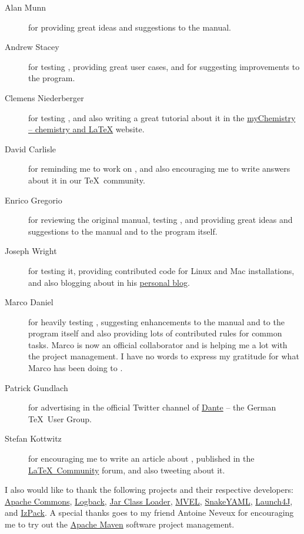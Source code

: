 \documentclass[a4paper,twoside,12pt]{memoir}
\begin{document}
\begin{description}
\item[Alan Munn] for providing great ideas and suggestions to the manual.
\item[Andrew Stacey] for testing \arara, providing great user cases, and for suggesting improvements to the program.
\item[Clemens Niederberger] for testing \arara, and also writing a great tutorial about it in the \href{http://www.mychemistry.eu/2012/06/arara-automate-latex-birds-music/}{myChemistry  -- chemistry and \LaTeX} website.
\item[David Carlisle] for reminding me to work on \arara, and also encouraging me to write answers about it in our \TeX\ community.
\item[Enrico Gregorio] for reviewing the original manual, testing \arara, and providing great ideas and suggestions to the manual and to the program itself.
\item[Joseph Wright] for testing it, providing contributed code for Linux and Mac installations, and also blogging about \arara in his \href{http://www.texdev.net}{personal blog}.
\item[Marco Daniel] for heavily testing \arara, suggesting enhancements to the manual and to the program itself and also providing lots of contributed rules for common tasks. Marco is now an official collaborator and is helping me a lot with the project management. I have no words to express my gratitude for what Marco has been doing to \arara.
\item[Patrick Gundlach] for advertising \arara in the official Twitter channel of \href{http://www.dante.de}{Dante} -- the German \TeX\ User Group.
\item[Stefan Kottwitz] for encouraging me to write an article about \arara, published in the \href{http://latex-community.org/know-how/435-gnuplot-arara}{\LaTeX\ Community} forum, and also tweeting about it.
\end{description}

I also would like to thank the following projects and their respective developers: \href{http://commons.apache.org}{Apache Commons}, \href{http://logback.qos.ch}{Logback}, \href{http://sourceforge.net/projects/jcloader}{Jar Class Loader}, \href{http://mvel.codehaus.org}{MVEL}, \href{http://code.google.com/p/snakeyaml}{SnakeYAML}, \href{http://launch4j.sourceforge.net}{Launch4J}, and \href{http://izpack.github.com}{IzPack}. A special thanks goes to my friend Antoine Neveux for encouraging me to try out the \href{http://maven.apache.org}{Apache Maven} software project management.
\end{document}
